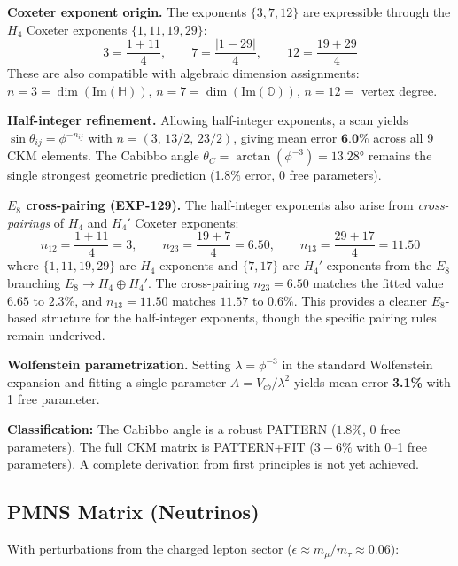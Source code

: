 \documentclass[12pt,a4paper]{article}
\begin{document}
\textbf{Coxeter exponent origin.} The exponents $\{3, 7, 12\}$ are expressible through the $H_4$ Coxeter exponents $\{1, 11, 19, 29\}$:
\begin{equation}
3 = \frac{1+11}{4}, \qquad 7 = \frac{|1-29|}{4}, \qquad 12 = \frac{19+29}{4}
\end{equation}
These are also compatible with algebraic dimension assignments: $n = 3 = \dim(\text{Im}(\mathbb{H}))$, $n = 7 = \dim(\text{Im}(\mathbb{O}))$, $n = 12 = $ vertex degree.

\textbf{Half-integer refinement.} Allowing half-integer exponents, a scan yields $\sin\theta_{ij} = \phi^{-n_{ij}}$ with $n = (3,\, 13/2,\, 23/2)$, giving mean error $\textbf{6.0\%}$ across all 9 CKM elements. The Cabibbo angle $\theta_C = \arctan(\phi^{-3}) = 13.28°$ remains the single strongest geometric prediction (1.8\% error, 0 free parameters).

\textbf{$E_8$ cross-pairing (EXP-129).} The half-integer exponents also arise from \emph{cross-pairings} of $H_4$ and $H_4'$ Coxeter exponents:
\begin{equation}
n_{12} = \frac{1+11}{4} = 3, \qquad n_{23} = \frac{19+7}{4} = 6.50, \qquad n_{13} = \frac{29+17}{4} = 11.50
\end{equation}
where $\{1,11,19,29\}$ are $H_4$ exponents and $\{7,17\}$ are $H_4'$ exponents from the $E_8$ branching $E_8 \to H_4 \oplus H_4'$. The cross-pairing $n_{23} = 6.50$ matches the fitted value $6.65$ to $2.3\%$, and $n_{13} = 11.50$ matches $11.57$ to $0.6\%$. This provides a cleaner $E_8$-based structure for the half-integer exponents, though the specific pairing rules remain underived.

\textbf{Wolfenstein parametrization.} Setting $\lambda = \phi^{-3}$ in the standard Wolfenstein expansion and fitting a single parameter $A = V_{cb}/\lambda^2$ yields mean error \textbf{3.1\%} with 1 free parameter.

\textbf{Classification:} The Cabibbo angle is a robust PATTERN ($1.8\%$, 0 free parameters). The full CKM matrix is PATTERN+FIT ($3{-}6\%$ with 0--1 free parameters). A complete derivation from first principles is not yet achieved.

\subsection{PMNS Matrix (Neutrinos)}

With perturbations from the charged lepton sector ($\epsilon \approx m_\mu/m_\tau \approx 0.06$):
\end{document}
